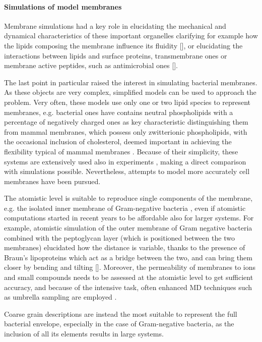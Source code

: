 \paragraph{Simulations of model membranes} 
Membrane simulations had a key role in elucidating the mechanical and dynamical characteristics of these important organelles clarifying for example how the lipids composing the membrane influence its fluidity [], or elucidating the interactions between lipids and surface proteins, transmembrane ones or membrane active peptides, such as antimicrobial ones [].

The last point in particular raised the interest in simulating bacterial membranes. As these objects are very complex, simplified models can be used to approach the problem.
%
Very often, these models use only one or two lipid species to represent membranes, e.g. bacterial ones have contains neutral phospholipids with a percentage of negatively charged ones \cite{Lipkin2017,Wang2012,Zhao2018,Chen2019} as key characteristic distinguishing them from mammal membranes, which possess only zwitterionic phospholipids, with the occasional inclusion of cholesterol, deemed important in achieving the flexibility typical of mammal membranes \cite{Lipkin2017,Wang2012,Zhao2018,Chen2019,Risselada2008}.
%
Because of their simplicity, these systems are extensively used also in experiments \cite{Castelletto2016,Tang2009,Glukhov2005}, making a direct comparison with simulations possible. Nevertheless, attempts to model more accurately cell membranes have been pursued.

The atomistic level is suitable to reproduce single components of the membrane, e.g. the isolated inner membrane of Gram-negative bacteria \cite{Piggot2011}, even if atomistic computations started in recent years to be affordable also for larger systems.
%
For example, atomistic simulation of the outer membrane of Gram negative bacteria combined with the peptoglycan layer (which is positioned between the two membranes) elucidated how the distance is variable, thanks to the presence of Braun's lipoproteins which act as a bridge between the two, and can bring them closer by bending and tilting [].
%
Moreover, the permeability of membranes to ions and small compounds needs to be assessed at the atomistic level to get sufficient accuracy, and because of the intensive task, often enhanced MD techniques such as umbrella sampling are employed \cite{Carpenter2016}.

Coarse grain descriptions are instead the most suitable to represent the full bacterial envelope, especially in the case of Gram-negative bacteria, as the inclusion of all its elements results in large systems.

